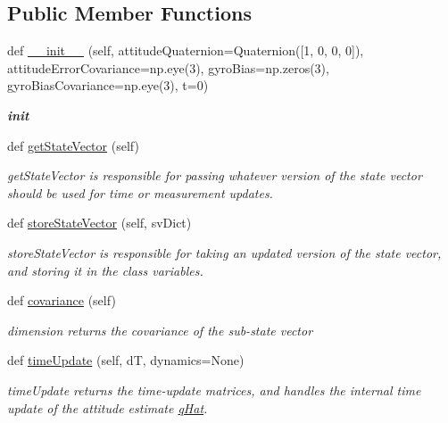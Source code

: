 \subsection*{Public Member Functions}
\begin{DoxyCompactItemize}
\item 
def \hyperlink{classAttitudeSubstate_1_1AttitudeState6DOF_a337e9fa07d0211f86b359e5d9deee1b8}{\+\_\+\+\_\+init\+\_\+\+\_\+} (self, attitude\+Quaternion=Quaternion(\mbox{[}1, 0, 0, 0\mbox{]}), attitude\+Error\+Covariance=np.\+eye(3), gyro\+Bias=np.\+zeros(3), gyro\+Bias\+Covariance=np.\+eye(3), t=0)
\begin{DoxyCompactList}\small\item\em {\bfseries init} \end{DoxyCompactList}\item 
def \hyperlink{classAttitudeSubstate_1_1AttitudeState6DOF_a8e420e4a7806669c1286a1a70ce019da}{get\+State\+Vector} (self)
\begin{DoxyCompactList}\small\item\em get\+State\+Vector is responsible for passing whatever version of the state vector should be used for time or measurement updates. \end{DoxyCompactList}\item 
def \hyperlink{classAttitudeSubstate_1_1AttitudeState6DOF_a8ed0ab1ebe989bd7d54c12889c7bf2a9}{store\+State\+Vector} (self, sv\+Dict)
\begin{DoxyCompactList}\small\item\em store\+State\+Vector is responsible for taking an updated version of the state vector, and storing it in the class variables. \end{DoxyCompactList}\item 
def \hyperlink{classAttitudeSubstate_1_1AttitudeState6DOF_a44691ece9ee2a36d3c11f12e72004e41}{covariance} (self)
\begin{DoxyCompactList}\small\item\em dimension returns the covariance of the sub-\/state vector \end{DoxyCompactList}\item 
def \hyperlink{classAttitudeSubstate_1_1AttitudeState6DOF_a9b27c2b6d9e51256918edd8505df0bd7}{time\+Update} (self, dT, dynamics=None)
\begin{DoxyCompactList}\small\item\em time\+Update returns the time-\/update matrices, and handles the internal time update of the attitude estimate \hyperlink{classAttitudeSubstate_1_1AttitudeState6DOF_a36a58a47280151dd544762d9a1d5c35d}{q\+Hat}. \end{DoxyCompactList}\item 

\end{DoxyCompactItemize}

